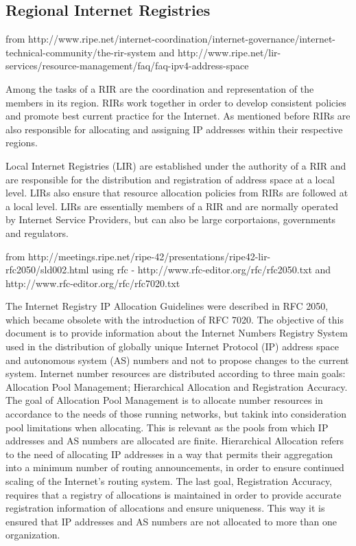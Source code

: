 \documentclass[11pt]{report}
\begin{document}
\subsection{Regional Internet Registries}
from http://www.ripe.net/internet-coordination/internet-governance/internet-technical-community/the-rir-system and http://www.ripe.net/lir-services/resource-management/faq/faq-ipv4-address-space


Among the tasks of a RIR are the coordination and representation of the members in its region. RIRs work together in order to develop consistent policies and promote best current practice for the Internet. As mentioned before RIRs are also responsible for allocating and assigning IP addresses within their respective regions. 

Local Internet Registries (LIR) are  established under the authority of a RIR and are responsible for the distribution and registration of address space at a local level. LIRs also ensure that resource allocation policies from RIRs are followed at a local level. LIRs are essentially members of a RIR and are normally operated by Internet Service Providers, but can also be large corportaions, governments and regulators.

from http://meetings.ripe.net/ripe-42/presentations/ripe42-lir-rfc2050/sld002.html using rfc - http://www.rfc-editor.org/rfc/rfc2050.txt and http://www.rfc-editor.org/rfc/rfc7020.txt

The Internet Registry IP Allocation Guidelines were described in RFC 2050, which became obsolete with the introduction of RFC 7020. The objective of this document is to provide information about the Internet Numbers Registry System used in the distribution of globally unique Internet Protocol (IP) address space and autonomous system (AS) numbers and not to propose changes to the current system. Internet number resources are distributed according to three main goals: Allocation Pool Management; Hierarchical Allocation and Registration Accuracy. The goal of Allocation Pool Management is to allocate number resources in accordance to the needs of those running networks, but takink into consideration pool limitations when allocating. This is relevant as the pools from which IP addresses and AS numbers are allocated are finite. Hierarchical Allocation refers to the need of allocating IP addresses in a way that permits their aggregation into a minimum number of routing announcements, in order to ensure continued scaling of the Internet's routing system. The last goal, Registration Accuracy,  requires that a registry of allocations is maintained in order to provide accurate registration information of allocations and ensure uniqueness. This way it is ensured that IP addresses and AS numbers are not allocated to more than one organization.  
\end{document}
